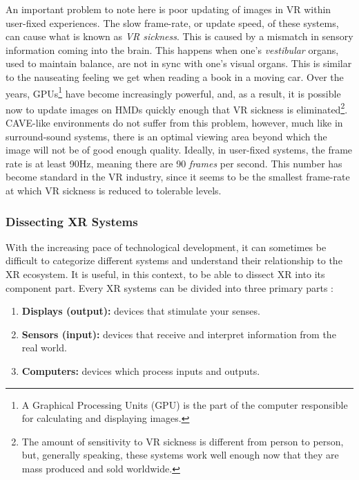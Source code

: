 An important problem to note here is poor updating of images in VR within user-fixed experiences. The slow frame-rate, or update speed, of these systems, can cause what is known as \textit{VR sickness}. This is caused by a mismatch in sensory information coming into the brain. This happens when one's \textit{vestibular} organs, used to maintain balance, are not in sync with one's visual organs. This is similar to the nauseating feeling we get when reading a book in a moving car. Over the years, GPUs\footnote{A Graphical Processing Units (GPU) is the part of the computer responsible for calculating and displaying images.} have become increasingly powerful, and, as a result, it is possible now to update images on HMDs quickly enough that VR sickness is eliminated\footnote{The amount of sensitivity to VR sickness is different from person to person, but, generally speaking, these systems work well enough now that they are mass produced and sold worldwide.}. CAVE-like environments do not suffer from this problem, however, much like in surround-sound systems, there is an optimal viewing area beyond which the image will not be of good enough quality. Ideally, in user-fixed systems, the frame rate is at least 90Hz, meaning there are 90 \textit{frames} per second. This number has become standard in the VR industry, since it seems to be the smallest frame-rate at which VR sickness is reduced to tolerable levels. 


\subsubsection{Dissecting XR Systems}

With the increasing pace of technological development, it can sometimes be difficult to categorize different systems and understand their relationship to the XR ecosystem. It is useful, in this context, to be able to dissect XR into its component part. Every XR systems can be divided into three primary parts \cite{lavalle2016virtual}:

\begin{enumerate}
    \item \textbf{Displays (output):} devices that stimulate your senses. %
    \item \textbf{Sensors (input):} devices that receive and interpret information from the real world. %
    \item \textbf{Computers:} devices which process inputs and outputs.
\end{enumerate}

